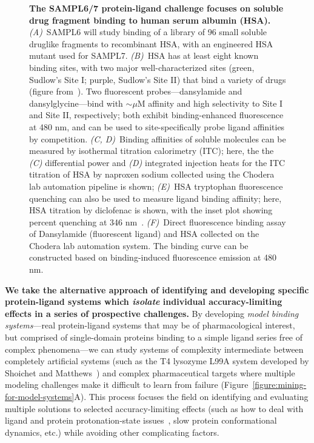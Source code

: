\documentclass[11pt]{article}
\begin{document}
\begin{figure}[h]
\begin{centering}
\end{centering}
\vspace{-0.1in}
\caption{\footnotesize {\bf The SAMPL6/7 protein-ligand challenge focuses on soluble drug fragment binding to human serum albumin (HSA).}
\emph{(A)}~SAMPL6 will study binding of a library of 96 small soluble druglike fragments to recombinant HSA, with an engineered HSA mutant used for SAMPL7.
\emph{(B)}~HSA has at least eight known binding sites, with two major well-characterized sites (green, Sudlow's Site I; purple, Sudlow's Site II) that bind a variety of drugs (figure from~\cite{Hall:2013:JournalofChemicalInformationandModeling}).
Two fluorescent probes---dansylamide and dansylglycine---bind with $\sim$$\mu$M affinity and high selectivity to Site I and Site II, respectively; both exhibit binding-enhanced fluorescence at 480 nm, and can be used to site-specifically probe ligand affinities by competition.
\emph{(C, D)}~Binding affinities of soluble molecules can be measured by isothermal titration calorimetry (ITC); here, the the \emph{(C)} differential power and \emph{(D)} integrated injection heats for the ITC titration of HSA by naproxen sodium collected using the Chodera lab automation pipeline is shown;
\emph{(E)}~HSA tryptophan fluorescence quenching can also be used to measure ligand binding affinity; here, HSA titration by diclofenac is shown, with the inset plot showing percent quenching at 346 nm~\cite{Epps:1999:JournalofPharmacyandPharmacology,Bou-Abdallah:2016:TheJournalofChemicalThermodynamics}.
\emph{(F)}~Direct fluorescence binding assay of Dansylamide (fluorescent ligand) and HSA collected on the Chodera lab automation system. 
The binding curve can be constructed based on binding-induced fluorescence emission at 480 nm.
\vspace{-0.1in}
\label{figure:hsa-challenge}}
\end{figure}

{\bf We take the alternative approach of identifying and developing specific protein-ligand systems which \emph{isolate} individual accuracy-limiting effects in a series of prospective challenges.}
By developing \emph{model binding systems}---real protein-ligand systems that may be of pharmacological interest, but comprised of single-domain proteins binding to a simple ligand series free of complex phenomena---we can study systems of complexity intermediate between completely artificial systems (such as the T4 lysozyme L99A system developed by Shoichet and Matthews~\cite{mobley_predicting_2007,merski_homologous_2015, mobley_predicting_2016}) and complex pharmaceutical targets where multiple modeling challenges make it difficult to learn from failure (Figure~\ref{figure:mining-for-model-systems}A).
This process focuses the field on identifying and evaluating multiple solutions to selected accuracy-limiting effects (such as how to deal with ligand and protein protonation-state issues~\cite{Onufriev:2013:QuarterlyReviewsofBiophysics}, slow protein conformational dynamics, etc.) while avoiding other complicating factors.
\end{document}

